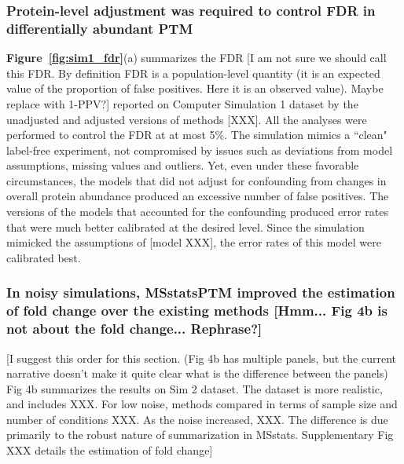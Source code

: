 \documentclass[mcp]{article}
\numberwithin{table}{section}
\def\todo#1{{\color{red}[#1]}}
\def\figref#1{{\bf Figure~\ref{fig:#1}}}
\begin{document}
\subsubsection*{Protein-level adjustment was required to control FDR in differentially abundant PTM}

\figref{sim1_fdr}(a) summarizes the FDR \todo{I am not sure we should call this FDR. By definition FDR is a population-level quantity (it is an expected value of the proportion of false positives. Here it is an observed value). Maybe replace with 1-PPV?} reported on Computer Simulation 1 dataset by the unadjusted and adjusted versions of methods \todo{XXX}. All the analyses were performed to control the FDR at at most 5\%.  The  simulation mimics a ``clean" label-free experiment, not compromised by issues such as deviations from model assumptions, missing values and outliers. Yet, even under these favorable circumstances, the models that did not adjust for confounding from changes in overall protein abundance produced an excessive number of false positives. The versions of the models that accounted for the confounding produced error rates that were much better calibrated at the desired level. Since the simulation mimicked the assumptions of \todo{model XXX}, the error rates of this model were calibrated best.



\subsubsection*{In noisy simulations, MSstatsPTM improved the estimation of fold change over the existing methods \todo{Hmm... Fig 4b is not about the fold change... Rephrase?}}

\todo{I suggest this order for this section. (Fig 4b has multiple panels, but the current narrative doesn't make it quite clear what is the difference between the panels) Fig 4b summarizes the results on Sim 2 dataset. The dataset is more realistic, and includes XXX. For low noise, methods compared in terms of sample size and number of conditions XXX. As the noise increased, XXX. The difference is due primarily to the robust nature of summarization in MSstats. Supplementary Fig XXX details the estimation of fold change}
\end{document}
